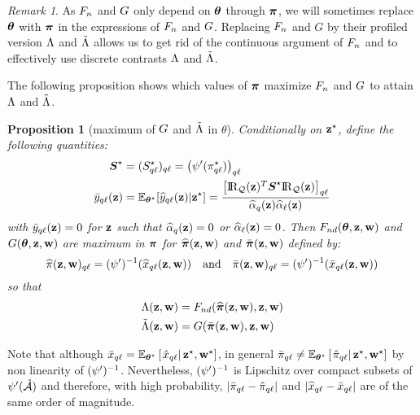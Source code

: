 \documentclass[]{imsart}
\newcommand{\1}{\mathds{1}}
\numberwithin{equation}{section}
\theoremstyle{plain}
\newtheorem{proposition}[thm]{Proposition}
\theoremstyle{remark}
\newtheorem{rem}[thm]{Remark}
\begin{document}
\begin{rem}
As  $F_{n}$ and $G$ only depend on $\boldsymbol{\theta}$ through $\boldsymbol{\pi}$, we will sometimes replace $\boldsymbol{\theta}$ with $\boldsymbol{\pi}$ in the expressions of $F_{n}$ and $G$. Replacing $F_{n}$ and $G$ by their profiled version $\Lambda$ and $\tilde{\Lambda}$ allows us to get rid of the continuous argument of $F_{n}$ and to effectively use discrete contrasts $\Lambda$ and $\tilde{\Lambda}$.
\end{rem}

The following proposition shows which values of $\boldsymbol{\pi}$ maximize $F_{n}$ and $G$ to attain $\Lambda$ and $\tilde{\Lambda}$.
\begin{proposition}[maximum of $G$ and $\tilde{\Lambda}$ in $\theta$]
\label{prop:profile-likelihood}
Conditionally on  $\mathbf{z}^\star$, define
the following quantities:
\begin{equation}
  \label{eq:profile-likelihood-notations}
  \begin{aligned}
    \Sal & = (\Salkl)_{\kk\el} = \left( \normp(\alskl) \right)_{\kk\el} \\
    \barykl(\bz) & = \Esp_{\bthetas}[\hyklz | \bzs] = \frac{\left[ \RQbz\transpose \Sal \RQbz \right]_{\kk\el}}{\pizk\pizl}
  \end{aligned}
\end{equation}
with $\bar{y}_{q\ell}(\mathbf{z})=0$ for $\mathbf{z}$ such that $\widehat{\alpha}_{q}(\mathbf{z})=0$ or $\widehat{\alpha}_{\ell}(\mathbf{z})=0$. 
Then $F_{nd}(\boldsymbol{\theta}, \mathbf{z}, \mathbf{w})$ and $G(\boldsymbol{\theta}, \mathbf{z}, \mathbf{w})$ are maximum in $\boldsymbol{\pi}$ for  $\widehat{\boldsymbol{\pi}}(\mathbf{z}, \mathbf{w})$ and $\bar{\boldsymbol{\pi}}(\mathbf{z}, \mathbf{w})$ defined by:
\begin{equation*}
  \hal(\bz, \bw)_{\kk\el} = \normpm ( \hxklzw ) \quad \text{and} \quad \bar{\al}(\bz, \bw)_{\kk\el} = \normpm ( \barxkl(\bz, \bw) )
\end{equation*}
so that
\begin{equation*}
  \begin{aligned}
    \Lamb(\bz, \bw) & = \Fnd(\hbal(\bz, \bw), \bz, \bw) %
    \\
    \Lambtilde(\bz, \bw) & = \G(\bar{\bal}(\bz, \bw), \bz, \bw) %
  \end{aligned}
\end{equation*}
\end{proposition}
Note that although $\bar{x}_{q\ell} = \mathbb{E}_{\boldsymbol{\theta}^\star}\left[\left.\hat{x}_{q\ell}\right|\mathbf{z}^\star,\mathbf{w}^\star\right]$, in general %
$\bar{\pi}_{q\ell} \neq \mathbb{E}_{\boldsymbol{\theta}^\star}\left[\left.\hat{\pi}_{q\ell}\right|\mathbf{z}^\star,\mathbf{w}^\star\right]$ by non linearity of $(\psi')^{-1}$. Nevertheless, $(\psi')^{-1}$ is Lipschitz over compact subsets of $\psi'(\mathring{\mathcal{A}})$ and therefore, with high probability, $|\bar{\pi}_{q\ell} - \hat{\pi}_{q\ell}|$ and $|\widehat{x}_{q\ell} - \bar{x}_{q\ell}|$ are of the same order of magnitude. 
\end{document}

